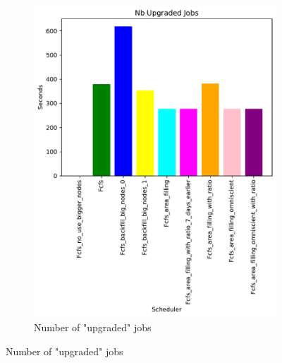 \documentclass[a4paper]{article}
\begin{document}
\begin{figure}[H]
\begin{subfigure}[b]{0.4\linewidth}\centering\includegraphics[width=0.95\linewidth]{MBSS/plot/Size_Constraint_2022-01-17->2022-01-17_V9271_Nb_Upgraded_Jobs_450_128_32_256_4_1024.pdf}\caption{Number of "upgraded" jobs}\label{45}\end{subfigure}

\end{figure}
\end{document}
